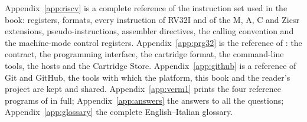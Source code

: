 Appendix~\ref{app:riscv} is a complete reference of the \riscv instruction set
used in the book: registers, formats, every instruction of RV32I and of the M,
A, C and Zicsr extensions, pseudo-instructions, assembler directives, the
calling convention and the machine-mode control registers.
Appendix~\ref{app:prg32} is the reference of \prg: the contract, the
programming interface, the cartridge format, the command-line tools, the hosts
and the Cartridge Store. Appendix~\ref{app:github} is a reference of Git and
GitHub, the tools with which the platform, this book and the reader's project
are kept and shared. Appendix~\ref{app:verm1} prints the four reference
programs of \vermone in full; Appendix~\ref{app:answers} the answers to all the
questions; Appendix~\ref{app:glossary} the complete English--Italian glossary.
